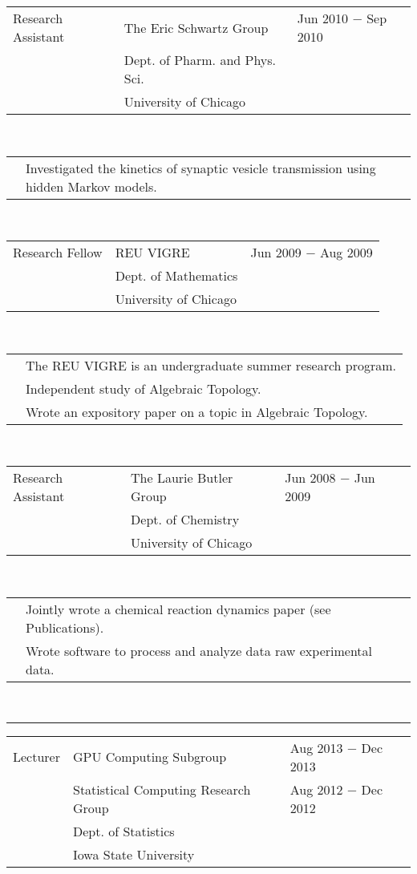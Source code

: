 \documentclass{article}
\newcommand{\q}{$\quad$ \newline}
\newcommand{\vl}{4.25}
\newcommand{\wl}{8.4}
\newcommand{\ww}{13}
\newcommand{\myrule}{\noindent \rule{\textwidth}{1pt}}
\begin{document}
\noindent \begin{tabular}{@{}p{\vl cm}p{\wl cm}l@{}}
Research Assistant & The Eric Schwartz Group & Jun 2010 $-$ Sep 2010  \\ 
 &Dept. of Pharm. and Phys. Sci.&  \\ 
 &University of Chicago &
\end{tabular} \q \q

\noindent \begin{tabular}{@{}p{\vl cm}p{\ww cm}@{}}
&Investigated the kinetics of synaptic vesicle transmission using hidden Markov models.
\end{tabular} \q \q

\noindent \begin{tabular}{@{}p{\vl cm}p{\wl cm}l@{}}
Research Fellow & REU VIGRE & Jun 2009 $-$ Aug 2009  \\ 
 &Dept. of Mathematics &  \\ 
 &University of Chicago & 
\end{tabular} \q \q

\noindent \begin{tabular}{@{}p{\vl cm}p{\ww cm}@{}}
& The REU VIGRE is an undergraduate summer research program. \\
& Independent study of Algebraic Topology. \\
& Wrote an expository paper on a topic in Algebraic Topology.
\end{tabular} \q \q

\noindent \begin{tabular}{@{}p{\vl cm}p{\wl cm}l@{}}
Research Assistant & The Laurie Butler Group & Jun 2008 $-$ Jun 2009  \\ 
 &Dept. of Chemistry &  \\ 
 &University of Chicago &
\end{tabular} \q \q

\noindent \begin{tabular}{@{}p{\vl cm}p{\ww cm}@{}}
& Jointly wrote a chemical reaction dynamics paper (see Publications). \\
& Wrote software to process and analyze data raw experimental data.
\end{tabular} \q \q \q


\myrule
 
\noindent \begin{tabular}{@{}p{\vl cm}p{\wl cm}l@{}}
Lecturer & GPU Computing Subgroup & Aug 2013 $-$ Dec 2013 \\
& Statistical Computing Research Group & Aug 2012 $-$ Dec 2012 \\
& Dept. of Statistics & \\
& Iowa State University & 
\end{tabular} \q \q
   
\end{document}
